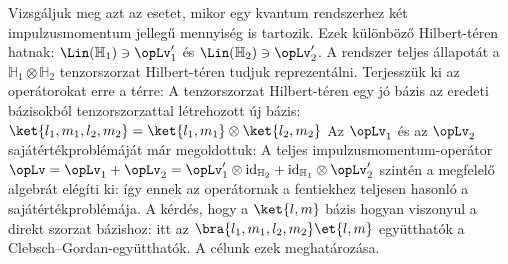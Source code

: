    Vizsgáljuk meg azt az esetet, mikor egy kvantum rendszerhez két impulzusmomentum jellegű mennyiség is tartozik.
   Ezek különböző Hilbert-téren hatnak: $\Lin(\mathbb{H}_1)\ni\opLv'_1$ és $\Lin(\mathbb{H}_2)\ni\opLv'_2$.
   A rendszer teljes állapotát a $\mathbb{H}_1\otimes\mathbb{H}_2$ tenzorszorzat Hilbert-téren tudjuk reprezentálni.
   Terjesszük ki az operátorokat erre a térre: 
   A tenzorszorzat Hilbert-téren egy jó bázis az eredeti bázisokból tenzorszorzattal létrehozott új bázis: $\ket{l_1,m_1,l_2,m_2}=\ket{l_1,m_1}\otimes\ket{l_2,m_2}$
   Az $\opLv_1$ és az $\opLv_2$ sajátértékproblémáját már megoldottuk:
   A teljes impulzusmomentum-operátor $\opLv=\opLv_1+\opLv_2=\opLv_1'\otimes\text{id}_{\mathbb{H}_2}+\text{id}_{\mathbb{H}_1}\otimes\opLv'_2$ szintén a megfelelő algebrát elégíti ki:
   így ennek az operátornak a fentiekhez teljesen hasonló a sajátértékproblémája. 
   A kérdés, hogy a $\ket{l,m}$ bázis hogyan viszonyul a direkt szorzat bázishoz:
   itt az $\bra{l_1,m_1,l_2,m_2}\et{l,m}$ együtthatók a Clebsch--Gordan-együtthatók.
   A célunk ezek meghatározása. 
   
